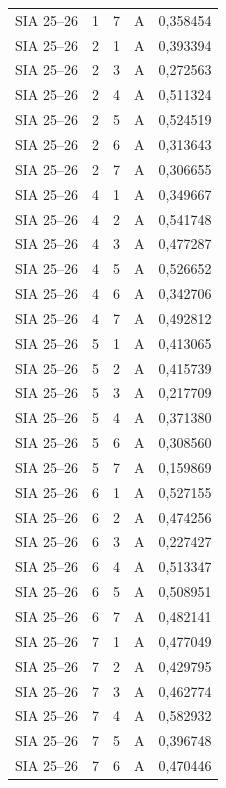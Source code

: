 \begin{longtable}{lrrrr}
SIA 25--26 & 1 & 7 & A & 0,358454 \\
SIA 25--26 & 2 & 1 & A & 0,393394 \\
SIA 25--26 & 2 & 3 & A & 0,272563 \\
SIA 25--26 & 2 & 4 & A & 0,511324 \\
SIA 25--26 & 2 & 5 & A & 0,524519 \\
SIA 25--26 & 2 & 6 & A & 0,313643 \\
SIA 25--26 & 2 & 7 & A & 0,306655 \\
SIA 25--26 & 4 & 1 & A & 0,349667 \\
SIA 25--26 & 4 & 2 & A & 0,541748 \\
SIA 25--26 & 4 & 3 & A & 0,477287 \\
SIA 25--26 & 4 & 5 & A & 0,526652 \\
SIA 25--26 & 4 & 6 & A & 0,342706 \\
SIA 25--26 & 4 & 7 & A & 0,492812 \\
SIA 25--26 & 5 & 1 & A & 0,413065 \\
SIA 25--26 & 5 & 2 & A & 0,415739 \\
SIA 25--26 & 5 & 3 & A & 0,217709 \\
SIA 25--26 & 5 & 4 & A & 0,371380 \\
SIA 25--26 & 5 & 6 & A & 0,308560 \\
SIA 25--26 & 5 & 7 & A & 0,159869 \\
SIA 25--26 & 6 & 1 & A & 0,527155 \\
SIA 25--26 & 6 & 2 & A & 0,474256 \\
SIA 25--26 & 6 & 3 & A & 0,227427 \\
SIA 25--26 & 6 & 4 & A & 0,513347 \\
SIA 25--26 & 6 & 5 & A & 0,508951 \\
SIA 25--26 & 6 & 7 & A & 0,482141 \\
SIA 25--26 & 7 & 1 & A & 0,477049 \\
SIA 25--26 & 7 & 2 & A & 0,429795 \\
SIA 25--26 & 7 & 3 & A & 0,462774 \\
SIA 25--26 & 7 & 4 & A & 0,582932 \\
SIA 25--26 & 7 & 5 & A & 0,396748 \\
SIA 25--26 & 7 & 6 & A & 0,470446 \\
\end{longtable}
\endgroup
